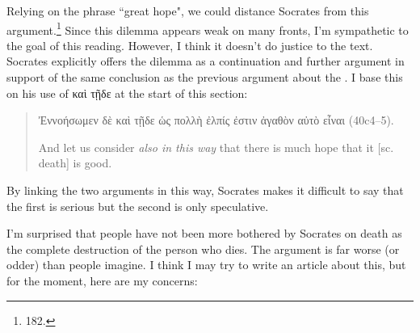 \documentclass[11pt]{article}
\begin{document}
Relying on the phrase ``great hope", we could distance Socrates from this
argument.\footnote{\citet{reeve1989} 182.}  Since this dilemma appears weak on
many fronts, I'm sympathetic to the goal of this reading.  However, I think it
doesn't do justice to the text.  Socrates explicitly offers the dilemma as
a continuation and further argument in support of the same conclusion as the
previous argument about the .  I base this on his use of {\g
καὶ τῇδε} at the start of this section:

\begin{quote}
    {\g Ἐννοήσωμεν δὲ καὶ τῇδε ὡς πολλὴ ἐλπίς ἐστιν ἀγαθὸν αὐτὸ εἶναι}
    (40c4--5).

    And let us consider \emph{also in this way} that there is much hope that it
    [sc. death] is good.
\end{quote}

By linking the two arguments in this way, Socrates makes it difficult to say
that the first is serious but the second is only speculative.

I'm surprised that people have not been more bothered by Socrates on death as
the complete destruction of the person who dies.  The argument is far worse (or
odder) than people imagine.  I think I may try to write an article about this,
but for the moment, here are my concerns:
\end{document}
